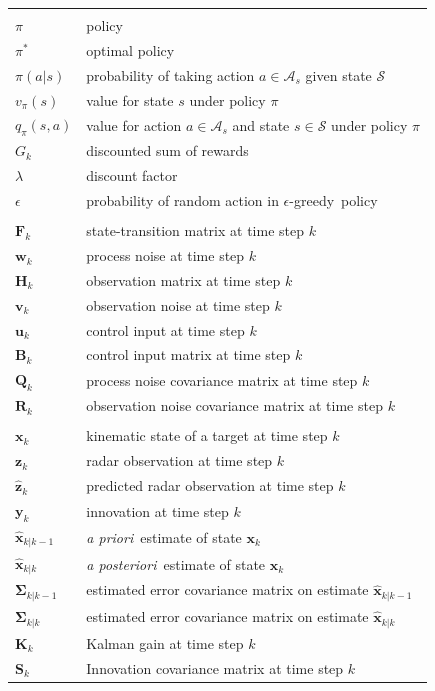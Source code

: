 \documentclass[english, 12pt, a4paper, elec, utf8, a-1b, online]{aaltothesis}
\renewcommand{\vec}[1]{\mathbf{#1}}
\newcommand{\Ss}{\mathcal{S}}
\newcommand{\As}{\mathcal{A}}
\newcommand{\egreedy}{$\epsilon$-greedy~}
\newcommand{\xprior}{\hat{\vec{x}}_{k|k-1}}
\newcommand{\xpost}{\hat{\vec{x}}_{k|k}}
\newcommand{\priorecov}{\boldsymbol{\Sigma}_{k|k-1}}
\newcommand{\postecov}{\boldsymbol{\Sigma}_{k|k}}
\newcommand{\prefitinnov}{\vec{y}_k}
\newcommand{\x}{\vec{x}_k}
\newcommand{\z}{\vec{z}_k}
\newcommand{\stmodel}{\vec{F}_k}
\newcommand{\cimodel}{\vec{B}_k}
\newcommand{\cinput}{\vec{u}_k}
\newcommand{\pnoise}{\vec{w}_k}
\newcommand{\omodel}{\vec{H}_k}
\newcommand{\onoise}{\vec{v}_k}
\newcommand{\ocov}{\vec{R}_k}
\newcommand{\pcov}{\vec{Q}_k}
\newcommand{\innocov}{\vec{S}_k}
\newcommand{\gain}{\vec{K}_k}
\def\prior{\textit{a priori}\ }
\def\post{\textit{a posteriori}\ }
\newcommand{\zhat}{\hat{\vec{z}}_k}
\begin{document}
\begin{longtable}{ll}
&\\
$\pi$ & policy \\
$\pi^*$ & optimal policy \\
$\pi(a|s)$ & probability of taking action $a \in \As_s$ given state $\Ss$ \\
$v_\pi(s)$ & value for state $s$ under policy $\pi$ \\
$q_\pi(s, a)$ & value for action $a \in \As_s$ and state $s \in \Ss$ under policy $\pi$ \\
$G_k$ & discounted sum of rewards \\
$\lambda$ & discount factor \\
$\epsilon$ & probability of random action in \egreedy policy \\
&\\
$\stmodel$ & state-transition matrix at time step $k$\\
$\pnoise$ & process noise at time step $k$\\
$\omodel$ & observation matrix at time step $k$\\
$\onoise$ & observation noise at time step $k$\\
$\cinput$ & control input at time step $k$\\
$\cimodel$ & control input matrix at time step $k$\\
$\pcov$ & process noise covariance matrix at time step $k$\\
$\ocov$ & observation noise covariance matrix at time step $k$\\
&\\
$\x$ & kinematic state of a target at time step $k$ \\
$\z$ & radar observation at time step $k$ \\
$\zhat$ & predicted radar observation at time step $k$ \\
$\prefitinnov$ & innovation at time step $k$ \\
$\xprior$ & \prior estimate of state $\x$\\
$\xpost$ & \post estimate of state $\x$ \\
$\priorecov$ & estimated error covariance matrix on estimate $\xprior$ \\
$\postecov$ & estimated error covariance matrix on estimate $\xpost$ \\
$\gain$ & Kalman gain at time step $k$ \\
$\innocov$ & Innovation covariance matrix at time step $k$ \\

\end{longtable}
\end{document}
